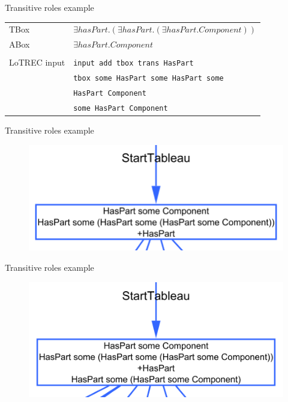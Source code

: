 \documentclass{beamer}
\begin{document}
\begin{frame}{Transitive roles example}

\begin{table}[h]
\begin{center}
\begin{tabular}{l l}
TBox & $\exists{}hasPart.(\exists{}hasPart.(\exists{}hasPart.Component))$ \\
ABox & $\exists{}hasPart.Component$ \\
\\
LoTREC input & \texttt{input add tbox trans HasPart} \\
 & \texttt{tbox some HasPart some HasPart some}\\
 & \texttt{HasPart Component}\\
 & \texttt{some HasPart Component} \\
\end{tabular}
\end{center}
\end{table}

\end{frame}

\begin{frame}{Transitive roles example}

\begin{figure}[h]
\begin{center}
\includegraphics[scale=0.5]{premodelzondertransitivity}
\end{center}
\end{figure}

\end{frame}

\begin{frame}{Transitive roles example}

\begin{figure}[h]
\begin{center}
\includegraphics[scale=0.5]{premodelmettransitivity}
\end{center}
\end{figure}

\end{frame}
\end{document}
